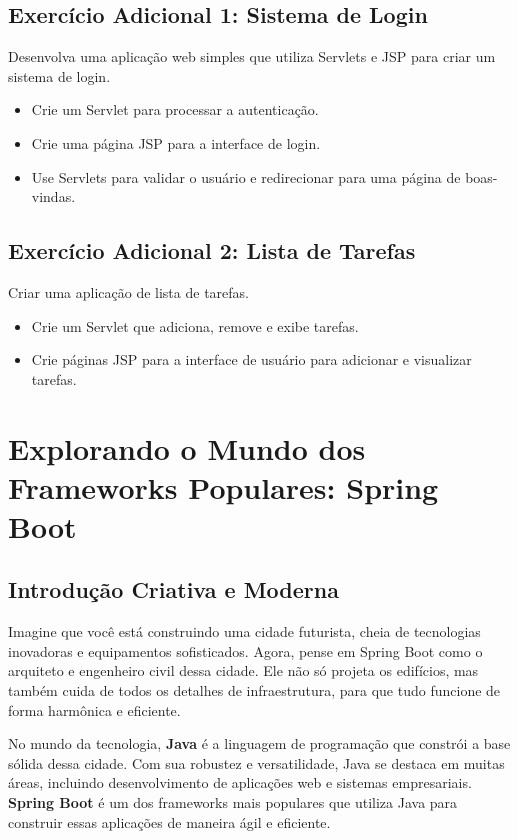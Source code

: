\documentclass[a4paper,12pt]{book}
\begin{document}
\subsection{Exercício Adicional 1: Sistema de Login}
Desenvolva uma aplicação web simples que utiliza Servlets e JSP para criar um sistema de login.

\begin{itemize}
    \item Crie um Servlet para processar a autenticação.
    \item Crie uma página JSP para a interface de login.
    \item Use Servlets para validar o usuário e redirecionar para uma página de boas-vindas.
\end{itemize}

\subsection{Exercício Adicional 2: Lista de Tarefas}
Criar uma aplicação de lista de tarefas.

\begin{itemize}
    \item Crie um Servlet que adiciona, remove e exibe tarefas.
    \item Crie páginas JSP para a interface de usuário para adicionar e visualizar tarefas.
\end{itemize}

\section{Explorando o Mundo dos Frameworks Populares: Spring Boot}

\subsection{Introdução Criativa e Moderna}
Imagine que você está construindo uma cidade futurista, cheia de tecnologias inovadoras e equipamentos sofisticados. Agora, pense em Spring Boot como o arquiteto e engenheiro civil dessa cidade. Ele não só projeta os edifícios, mas também cuida de todos os detalhes de infraestrutura, para que tudo funcione de forma harmônica e eficiente.

No mundo da tecnologia, \textbf{Java} é a linguagem de programação que constrói a base sólida dessa cidade. Com sua robustez e versatilidade, Java se destaca em muitas áreas, incluindo desenvolvimento de aplicações web e sistemas empresariais. \textbf{Spring Boot} é um dos frameworks mais populares que utiliza Java para construir essas aplicações de maneira ágil e eficiente.
\end{document}
